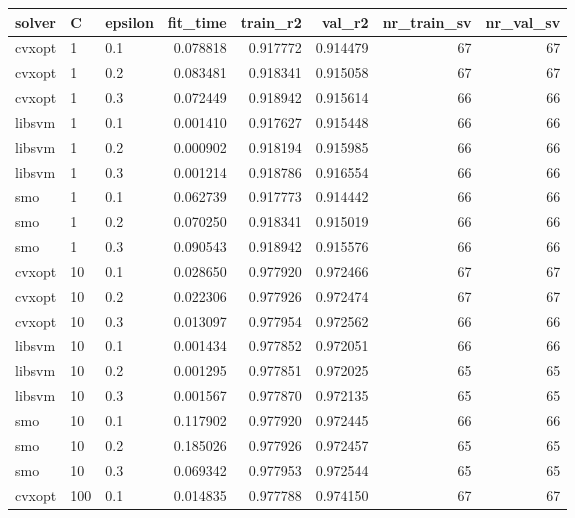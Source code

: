 \begin{tabular}{lllrrrrr}
\toprule
solver &   C & epsilon &  fit\_time &  train\_r2 &   val\_r2 &  nr\_train\_sv &  nr\_val\_sv \\
\midrule
cvxopt &   1 &     0.1 &  0.078818 &  0.917772 & 0.914479 &           67 &         67 \\
cvxopt &   1 &     0.2 &  0.083481 &  0.918341 & 0.915058 &           67 &         67 \\
cvxopt &   1 &     0.3 &  0.072449 &  0.918942 & 0.915614 &           66 &         66 \\
libsvm &   1 &     0.1 &  0.001410 &  0.917627 & 0.915448 &           66 &         66 \\
libsvm &   1 &     0.2 &  0.000902 &  0.918194 & 0.915985 &           66 &         66 \\
libsvm &   1 &     0.3 &  0.001214 &  0.918786 & 0.916554 &           66 &         66 \\
   smo &   1 &     0.1 &  0.062739 &  0.917773 & 0.914442 &           66 &         66 \\
   smo &   1 &     0.2 &  0.070250 &  0.918341 & 0.915019 &           66 &         66 \\
   smo &   1 &     0.3 &  0.090543 &  0.918942 & 0.915576 &           66 &         66 \\
cvxopt &  10 &     0.1 &  0.028650 &  0.977920 & 0.972466 &           67 &         67 \\
cvxopt &  10 &     0.2 &  0.022306 &  0.977926 & 0.972474 &           67 &         67 \\
cvxopt &  10 &     0.3 &  0.013097 &  0.977954 & 0.972562 &           66 &         66 \\
libsvm &  10 &     0.1 &  0.001434 &  0.977852 & 0.972051 &           66 &         66 \\
libsvm &  10 &     0.2 &  0.001295 &  0.977851 & 0.972025 &           65 &         65 \\
libsvm &  10 &     0.3 &  0.001567 &  0.977870 & 0.972135 &           65 &         65 \\
   smo &  10 &     0.1 &  0.117902 &  0.977920 & 0.972445 &           66 &         66 \\
   smo &  10 &     0.2 &  0.185026 &  0.977926 & 0.972457 &           65 &         65 \\
   smo &  10 &     0.3 &  0.069342 &  0.977953 & 0.972544 &           65 &         65 \\
cvxopt & 100 &     0.1 &  0.014835 &  0.977788 & 0.974150 &           67 &         67 \\

\end{tabular}
